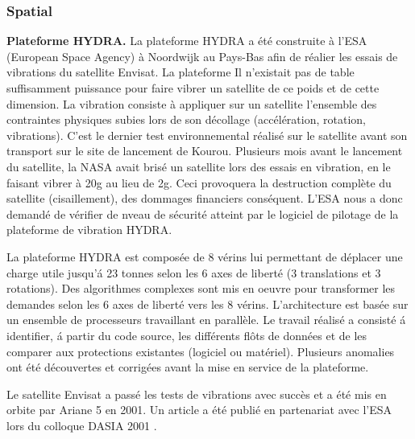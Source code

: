 \documentclass[a4paper,12pt]{article}
\begin{document}
\subsubsection{Spatial}
\textbf{Plateforme HYDRA.} La plateforme HYDRA a \'et\'e construite
\`a l'ESA (European Space Agency) \`a  Noordwijk au Pays-Bas afin
de r\'ealier les essais de vibrations du satellite Envisat. La
plateforme  Il n'existait pas de table suffisamment puissance pour
faire vibrer un satellite de ce poids et de cette dimension. La
vibration consiste \`a appliquer sur un satellite l'ensemble des
contraintes physiques subies lors de son d\'ecollage
(acc\'el\'eration, rotation, vibrations). C'est le dernier test
environnemental r\'ealis\'e sur le satellite avant son transport sur
le site de lancement de Kourou. Plusieurs mois avant le lancement du
satellite, la NASA avait bris\'e un satellite lors des essais en
vibration, en le faisant vibrer \`a 20g au lieu de 2g. Ceci provoquera
la destruction compl\`ete du satellite (cisaillement), des dommages
financiers cons\'equent. L'ESA nous a donc
demand\'e de v\'erifier de nveau de s\'ecurit\'e atteint par le
logiciel de pilotage de la plateforme de vibration HYDRA. 

La plateforme HYDRA est compos\'ee de 8 v\'erins lui permettant de
d\'eplacer une charge utile jusqu'\'a 23 tonnes selon les 6 axes de
libert\'e (3 translations et 3 rotations). Des algorithmes complexes
sont mis en oeuvre pour transformer les demandes selon les 6 axes de
libert\'e  vers les 8 v\'erins. L'architecture est bas\'ee sur
un ensemble de processeurs travaillant en parall\`ele. Le travail
r\'ealis\'e a consist\'e \'a identifier, \'a partir du code source,
les diff\'erents fl\^ots de donn\'ees et de les comparer aux
protections existantes (logiciel ou mat\'eriel). Plusieurs anomalies
ont \'et\'e d\'ecouvertes et corrig\'ees avant la mise en service de
la plateforme. 

Le satellite Envisat a pass\'e les tests de vibrations avec succ\`es et
a \'et\'e mis en orbite par Ariane 5 en 2001. Un article a \'et\'e
publi\'e en  partenariat avec l'ESA lors du colloque DASIA 2001
\cite{DASIA2001}.
\end{document}
